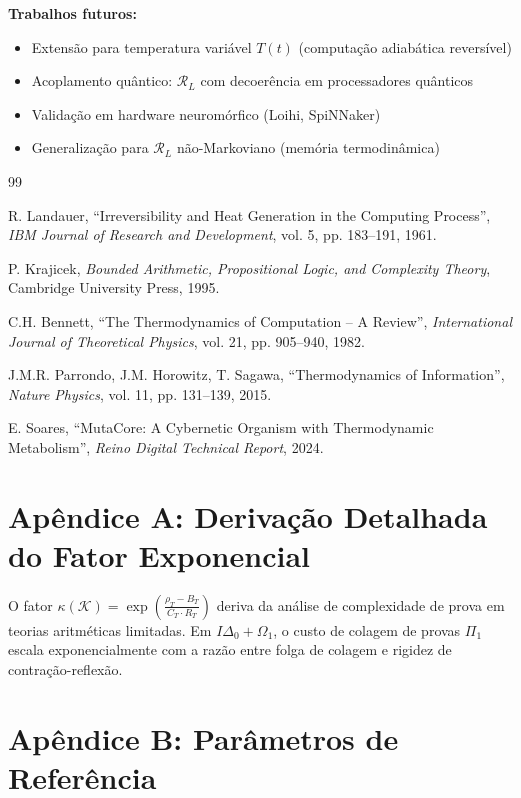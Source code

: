 \documentclass[11pt,a4paper]{article}
\newcommand{\rhoT}{\rho_T}
\newcommand{\BT}{B_T}
\newcommand{\CT}{C_T}
\newcommand{\RT}{R_T}
\newcommand{\RL}{\mathcal{R}_L}
\begin{document}
\textbf{Trabalhos futuros:}
\begin{itemize}
    \item Extensão para temperatura variável $T(t)$ (computação adiabática reversível)
    \item Acoplamento quântico: $\RL$ com decoerência em processadores quânticos
    \item Validação em hardware neuromórfico (Loihi, SpiNNaker)
    \item Generalização para $\RL$ não-Markoviano (memória termodinâmica)
\end{itemize}


\begin{thebibliography}{99}

R. Landauer, ``Irreversibility and Heat Generation in the Computing Process'',
\textit{IBM Journal of Research and Development}, vol. 5, pp. 183--191, 1961.

P. Krajicek, \textit{Bounded Arithmetic, Propositional Logic, and Complexity Theory},
Cambridge University Press, 1995.

C.H. Bennett, ``The Thermodynamics of Computation -- A Review'',
\textit{International Journal of Theoretical Physics}, vol. 21, pp. 905--940, 1982.

J.M.R. Parrondo, J.M. Horowitz, T. Sagawa, ``Thermodynamics of Information'',
\textit{Nature Physics}, vol. 11, pp. 131--139, 2015.

E. Soares, ``MutaCore: A Cybernetic Organism with Thermodynamic Metabolism'',
\textit{Reino Digital Technical Report}, 2024.

\end{thebibliography}

\appendix

\section{Apêndice A: Derivação Detalhada do Fator Exponencial}

O fator $\kappa(\mathcal{K}) = \exp\left( \frac{\rhoT - \BT}{\CT \cdot \RT} \right)$ deriva da análise de complexidade de prova em teorias aritméticas limitadas. Em $I\Delta_0 + \Omega_1$, o custo de colagem de provas $\Pi_1$ escala exponencialmente com a razão entre folga de colagem e rigidez de contração-reflexão.

\section{Apêndice B: Parâmetros de Referência}
\end{document}
